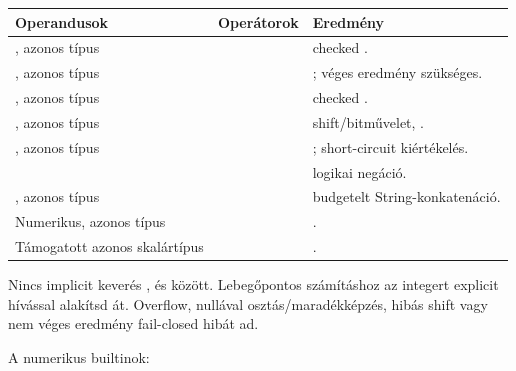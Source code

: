 \begin{center}
\begin{tabularx}{\textwidth}{@{}l l Y@{}}
\toprule
\textbf{Operandusok} & \textbf{Operátorok} & \textbf{Eredmény} \\
\midrule
{}, azonos típus & \code{+ - * / \%} & checked . \\
, azonos típus & \code{+ - * / \%} & ; véges eredmény szükséges. \\
, azonos típus & \code{+ - * / \%} & checked . \\
, azonos típus & \code{<< >> \& \^{} |} & shift/bitművelet, . \\
, azonos típus & \code{\&\& ||} & ; short-circuit kiértékelés. \\
 & \code{!} & logikai negáció. \\
, azonos típus & \code{+} & budgetelt String-konkatenáció. \\
Numerikus, azonos típus & \code{< <= > >=} & . \\
Támogatott azonos skalártípus & \code{== !=} & . \\
\bottomrule
\end{tabularx}
\end{center}

Nincs implicit keverés ,  és  között. Lebegőpontos számításhoz az integert explicit  hívással alakítsd át. Overflow, nullával osztás/maradékképzés, hibás shift vagy nem véges  eredmény fail-closed hibát ad.

A numerikus builtinok:

